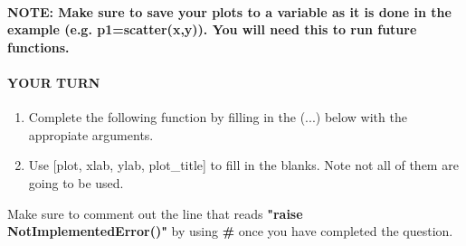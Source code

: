 \documentclass[11pt]{article}
\providecommand{\tightlist}{%
      \setlength{\itemsep}{0pt}\setlength{\parskip}{0pt}}
\begin{document}
    \paragraph{NOTE: Make sure to save your plots to a variable as it is
done in the example (e.g. p1=scatter(x,y)). You will need this to run
future
functions.}\label{note-make-sure-to-save-your-plots-to-a-variable-as-it-is-done-in-the-example-e.g.-p1scatterxy.-you-will-need-this-to-run-future-functions.}

    \paragraph{YOUR TURN}\label{your-turn}

\begin{enumerate}
\def\labelenumi{\arabic{enumi}.}
\tightlist
\item
  Complete the following function by filling in the (...) below with the
  appropiate arguments.
\item
  Use {[}plot, xlab, ylab, plot\_title{]} to fill in the blanks. Note
  not all of them are going to be used.
\end{enumerate}

Make sure to comment out the line that reads \textbf{"raise
NotImplementedError()"} by using \textbf{\#} once you have completed the
question.
\end{document}
